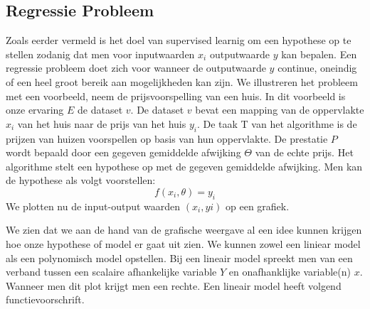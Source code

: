 \subsection{Regressie Probleem}\label{Regressie Probleem}

Zoals eerder vermeld is het doel van supervised learnig om een hypothese op te stellen zodanig dat men voor inputwaarden $x_{i}$ outputwaarde $y$ kan bepalen. Een regressie probleem doet zich voor wanneer de outputwaarde $y$ continue, oneindig of een heel groot bereik aan mogelijkheden kan zijn. We illustreren het probleem met een voorbeeld, neem de prijsvoorspelling van een huis. 
In dit voorbeeld is onze ervaring $E$ de dataset $v$. De dataset $v$ bevat een mapping van de oppervlakte $x_{i}$ van het huis naar de prijs van het huis $y_{i}$. De taak T van het algorithme is de prijzen van huizen voorspellen op basis van hun oppervlakte. De prestatie $P$ wordt bepaald door een gegeven gemiddelde afwijking $\Theta$ van de echte prijs. Het algorithme stelt een hypothese op met de gegeven gemiddelde afwijking. Men kan de hypothese als volgt voorstellen:
\[ f(x_{i},\theta) = y_{i} \] 
\newline
We plotten nu de input-output waarden $(x_{i},y{i})$ op een grafiek.
\newline
\begin{center}
\end{center}
\newline
%
 We zien dat we aan de hand van de grafische weergave al een idee kunnen krijgen hoe onze hypothese of model er gaat uit zien. We kunnen zowel een liniear model als een polynomisch model opstellen. Bij een lineair model spreekt men van een verband tussen een scalaire afhankelijke variable $Y$ en onafhanklijke variable(n) $x$. Wanneer men dit plot krijgt men een rechte. Een lineair model heeft volgend functievoorschrift.
